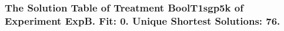  \begin{frame}
 \fontsize{8pt}{9pt}\selectfont
 \frametitle{ The Solution Table of Treatment BoolT1sgp5k of Experiment ExpB. Fit: 0. Unique Shortest Solutions: 76. }

 \label{ExpBSolutionTable008.tex}  
 \end{frame}

